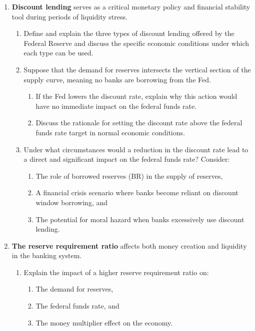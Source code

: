 \begin{enumerate}
    \item \textbf{Discount lending} serves as a critical monetary policy and financial stability
    tool during periods of liquidity stress.

    \begin{enumerate}
        \item Define and explain the three types of discount lending offered by the
        Federal Reserve and discuss the specific economic conditions under
        which each type can be used.

        \item Suppose that the demand for reserves intersects the vertical section of the
        supply curve, meaning no banks are borrowing from the Fed.
        \begin{enumerate}
            \item If the Fed lowers the discount rate, explain why this action would
            have no immediate impact on the federal funds rate.
            \item Discuss the rationale for setting the discount rate above the federal
            funds rate target in normal economic conditions.
        \end{enumerate}

        \item Under what circumstances would a reduction in the discount rate lead to
        a direct and significant impact on the federal funds rate? Consider:
        \begin{enumerate}
            \item The role of borrowed reserves (BR) in the supply of reserves,
            \item A financial crisis scenario where banks become reliant on discount
            window borrowing, and
            \item The potential for moral hazard when banks excessively use discount
            lending.
        \end{enumerate}
    \end{enumerate}

    \item \textbf{The reserve requirement ratio} affects both money creation and liquidity in the
    banking system.

    \begin{enumerate}
        \item Explain the impact of a higher reserve requirement ratio on:
        \begin{enumerate}
            \item The demand for reserves,
            \item The federal funds rate, and
            \item The money multiplier effect on the economy.
        \end{enumerate}


\end{enumerate}
\end{enumerate}
